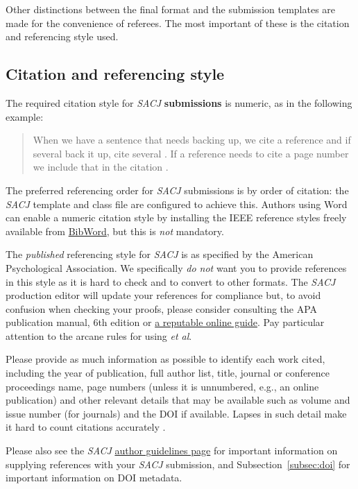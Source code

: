 \documentclass{article}
\begin{document}
Other distinctions between the final format and the submission templates are made for the convenience of referees. The most important of these is the citation and referencing style used.

\subsection{Citation and referencing style} \label{subsec:refs}
The required citation style for {\em SACJ} \textbf{submissions} is numeric, as in the following example:

\begin{quote}
    When we have a sentence that needs backing up, we cite a reference \cite{kopka1995guide} and if several back it up, cite several \cite{kopka1995guide,apa2013}. If a reference needs to cite a page number we include that in the citation \cite[p 42]{apa2013}.
\end{quote}
The preferred referencing order for {\em SACJ} submissions is by order of citation: the {\em SACJ} template and class file are configured to achieve this. Authors using Word can enable a numeric citation style by installing the IEEE reference styles freely available from \href{https://bibword.codeplex.com}{BibWord}, but this is {\em not} mandatory.

The {\em published} referencing style for {\em SACJ} is as specified by the American Psychological Association. We specifically {\em do not} want you to provide references in this
style as it is hard to check and to convert to other formats. The {\em SACJ} production editor will update your references for compliance but, to avoid confusion when checking your proofs, please consider consulting the APA publication manual, 6th edition \cite{apa2013} or \href{https://owl.english.purdue.edu/owl/resource/560/05/}{a reputable online guide}. Pay particular attention to the arcane rules for using {\em et al}.

Please provide as much information as possible to identify each work cited, including the year of publication, full author list, title, journal or conference proceedings name, page numbers (unless it is unnumbered, e.g., an online publication) and other relevant details that may be available such as volume and issue number (for journals) and the DOI if available. Lapses in such detail make it hard to count citations accurately \cite{lariviere2006place}.

Please also see the \emph{SACJ} \href{http://sacj.cs.uct.ac.za/index.php/sacj/about/submissions#authorGuidelines}{author guidelines page} for important information on supplying references with your {\em SACJ} submission, and Subsection~\ref{subsec:doi} for important information on DOI metadata.
\end{document}
